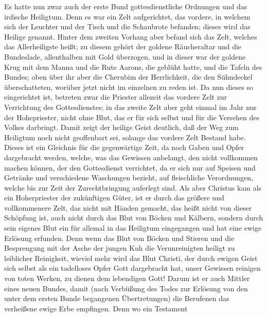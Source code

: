  Es hatte nun zwar auch der erste Bund gottesdienstliche
Ordnungen und das irdische Heiligtum.  Denn es war ein
Zelt aufgerichtet, das vordere, in welchem sich der Leuchter und der
Tisch und die Schaubrote befanden; dieses wird das Heilige genannt.
 Hinter dem zweiten Vorhang aber befand sich das Zelt,
welches das Allerheiligste heißt;  zu diesem gehört der
goldene Räucheraltar und die Bundeslade, allenthalben mit Gold
überzogen, und in dieser war der goldene Krug mit dem Manna und die Rute
Aarons, die geblüht hatte, und die Tafeln des Bundes; 
oben über ihr aber die Cherubim der Herrlichkeit, die den Sühndeckel
überschatteten, worüber jetzt nicht im einzelnen zu reden ist.
 Da nun dieses so eingerichtet ist, betreten zwar die
Priester allezeit das vordere Zelt zur Verrichtung des Gottesdienstes;
 in das zweite Zelt aber geht einmal im Jahr nur der
Hohepriester, nicht ohne Blut, das er für sich selbst und für die
Versehen des Volkes darbringt.  Damit zeigt der heilige
Geist deutlich, daß der Weg zum Heiligtum noch nicht geoffenbart sei,
solange das vordere Zelt Bestand habe.  Dieses ist ein
Gleichnis für die gegenwärtige Zeit, da noch Gaben und Opfer dargebracht
werden, welche, was das Gewissen anbelangt, den nicht vollkommen machen
können, der den Gottesdienst verrichtet,  da er sich nur
auf Speisen und Getränke und verschiedene Waschungen bezieht, auf
fleischliche Verordnungen, welche bis zur Zeit der Zurechtbringung
auferlegt sind.  Als aber Christus kam als ein
Hoherpriester der zukünftigen Güter, ist er durch das größere und
vollkommenere Zelt, das nicht mit Händen gemacht, das heißt nicht von
dieser Schöpfung ist,  auch nicht durch das Blut von
Böcken und Kälbern, sondern durch sein eigenes Blut ein für allemal in
das Heiligtum eingegangen und hat eine ewige Erlösung erfunden.
 Denn wenn das Blut von Böcken und Stieren und die
Besprengung mit der Asche der jungen Kuh die Verunreinigten heiligt zu
leiblicher Reinigkeit,  wieviel mehr wird das Blut
Christi, der durch ewigen Geist sich selbst als ein tadelloses Opfer
Gott dargebracht hat, unser Gewissen reinigen von toten Werken, zu
dienen dem lebendigen Gott!  Darum ist er auch Mittler
eines neuen Bundes, damit (nach Verbüßung des Todes zur Erlösung von den
unter dem ersten Bunde begangenen Übertretungen) die Berufenen das
verheißene ewige Erbe empfingen.  Denn wo ein Testament
